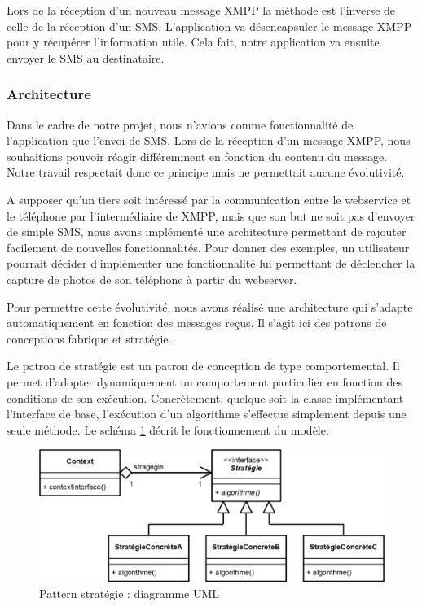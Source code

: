 Lors de la réception d'un nouveau message XMPP la méthode est l'inverse de celle de la réception d'un SMS.
L'application va désencapsuler le message XMPP pour y récupérer l'information utile.
Cela fait, notre application va ensuite envoyer le SMS au destinataire.


\subsubsection{Architecture}

Dans le cadre de notre projet, nous n'avions comme fonctionnalité de l'application que l'envoi de SMS.
Lors de la réception d'un message XMPP, nous souhaitions pouvoir réagir différemment en fonction du contenu du message.
Notre travail respectait donc ce principe mais ne permettait aucune évolutivité.

A supposer qu'un tiers soit intéressé par la communication entre le webservice et le téléphone par 
l'intermédiaire de XMPP, mais que son but ne soit pas d'envoyer de simple SMS, nous avons implémenté une
architecture permettant de rajouter facilement de nouvelles fonctionnalités. Pour donner des exemples, 
un utilisateur pourrait décider d'implémenter une fonctionnalité lui permettant de déclencher la capture
de photos de son téléphone à partir du webserver.
 
Pour permettre cette évolutivité, nous avons réalisé une architecture qui s'adapte automatiquement en
fonction des messages reçus. Il s'agit ici des patrons de conceptions fabrique et stratégie. 



Le patron de stratégie est un patron de conception de type comportemental.
Il permet d'adopter dynamiquement un comportement particulier en fonction des conditions de son exécution.
Concrètement, quelque soit la classe implémentant l'interface de base, l'exécution d'un algorithme s'effectue simplement depuis une seule méthode.
Le schéma \ref{pattern_strategie} décrit le fonctionnement du modèle.

\begin{figure}[H]
  \center
  \includegraphics[width=12cm]{img/pattern_strategie.png}
  \caption{Pattern stratégie : diagramme UML}
  \label{pattern_strategie}
\end{figure}

